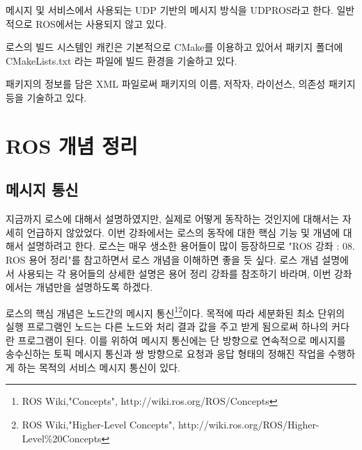 \begin{definition}[UDPROS]\label{def:RosUDPROS}
메시지 및 서비스에서 사용되는 UDP 기반의 메시지 방식을 UDPROS라고 한다. 일반적으로 ROS에서는 사용되지 않고 있다.
\end{definition}

\begin{definition}\label{def:RosCMakeLists.txt}
로스의 빌드 시스템인 캐킨은 기본적으로 CMake를 이용하고 있어서 패키지 폴더에 CMakeLists.txt 라는 파일에 빌드 환경을 기술하고 있다.
\end{definition}

\begin{definition}\label{def:RosPackage.XML}
패키지의 정보를 담은 XML 파일로써 패키지의 이름, 저작자, 라이선스, 의존성 패키지 등을 기술하고 있다.
\end{definition}

\section{ROS 개념 정리}

\subsection{메시지 통신}

지금까지 로스에 대해서 설명하였지만, 실제로 어떻게 동작하는 것인지에 대해서는 자세히 언급하지 않았었다. 이번 강좌에서는 로스의 동작에 대한 핵심 기능 및 개념에 대해서 설명하려고 한다. 로스는 매우 생소한 용어들이 많이 등장하므로 "ROS 강좌 : 08. ROS 용어 정리"를 참고하면서 로스 개념을 이해하면 좋을 듯 싶다. 로스 개념 설명에서 사용되는 각 용어들의 상세한 설명은 용어 정리 강좌를 참조하기 바라며, 이번 강좌에서는 개념만을 설명하도록 하겠다.

로스의 핵심 개념은 노드간의 메시지 통신\footnote{ROS Wiki,"Concepts", http://wiki.ros.org/ROS/Concepts}\footnote{ROS Wiki,"Higher-Level Concepts", http://wiki.ros.org/ROS/Higher-Level\%20Concepts}이다. 목적에 따라 세분화된 최소 단위의 실행 프로그램인 노드는 다른 노드와 처리 결과 값을 주고 받게 됨으로써 하나의 커다란 프로그램이 된다. 이를 위하여 메시지 통신에는 단 방향으로 연속적으로 메시지를 송수신하는 토픽 메시지 통신과 쌍 방향으로 요청과 응답 형태의 정해진 작업을 수행하게 하는 목적의 서비스 메시지 통신이 있다. 

